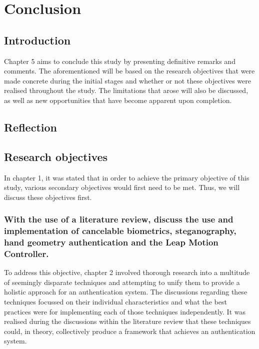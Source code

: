 \chapter{Conclusion}


\section{Introduction}

Chapter 5 aims to conclude this study by presenting definitive remarks and comments. The aforementioned will be based on the research objectives that were made concrete during the initial stages and whether or not these objectives were realised throughout the study. The limitations that arose will also be discussed, as well as new opportunities that have become apparent upon completion.

\section{Reflection}


\section{Research objectives}

In chapter 1, it was stated that in order to achieve the primary objective of this study, various secondary objectives would first need to be met. Thus, we will discuss these objectives first.

\subsection{With the use of a literature review, discuss the use and implementation of cancelable biometrics, steganography, hand geometry authentication and the Leap Motion Controller.}

To address this objective, chapter 2 involved thorough research into a multitude of seemingly disparate techniques and attempting to unify them to provide a holistic approach for an authentication system. The discussions regarding these techniques focussed on their individual characteristics and what the best practices were for implementing each of those techniques independently. It was realised during the discussions within the literature review that these techniques could, in theory, collectively produce a framework that achieves an authentication system.


